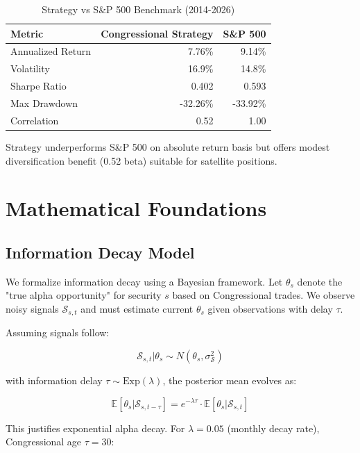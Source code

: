 \documentclass[twocolumn,ieee]{Base_Latex_Template/arithmaxresearch}
\begin{document}
\begin{table}[t]
\centering
\scriptsize
\setlength{\tabcolsep}{4pt}
\begin{tabular}{lrr}
\hline
\textbf{Metric} & \textbf{Congressional Strategy} & \textbf{S\&P 500} \\
\hline
Annualized Return & 7.76\% & 9.14\% \\
Volatility & 16.9\% & 14.8\% \\
Sharpe Ratio & 0.402 & 0.593 \\
Max Drawdown & -32.26\% & -33.92\% \\
Correlation & 0.52 & 1.00 \\
\hline
\end{tabular}
\caption{Strategy vs S\&P 500 Benchmark (2014-2026)}
\label{tab:benchmark}
\end{table}

Strategy underperforms S\&P 500 on absolute return basis but offers modest diversification benefit (0.52 beta) suitable for satellite positions.

\section{Mathematical Foundations}

\subsection{Information Decay Model}

We formalize information decay using a Bayesian framework. Let $\theta_s$ denote the "true alpha opportunity" for security $s$ based on Congressional trades. We observe noisy signals $\mathcal{S}_{s,t}$ and must estimate current $\theta_s$ given observations with delay $\tau$.

Assuming signals follow:

$$\mathcal{S}_{s,t} | \theta_s \sim N(\theta_s, \sigma_{\mathcal{S}}^2)$$

with information delay $\tau \sim \text{Exp}(\lambda)$, the posterior mean evolves as:

$$\mathbb{E}[\theta_s | \mathcal{S}_{s,t-\tau}] = e^{-\lambda\tau} \cdot \mathbb{E}[\theta_s | \mathcal{S}_{s,t}]$$

This justifies exponential alpha decay. For $\lambda = 0.05$ (monthly decay rate), Congressional age $\tau = 30$:
\end{document}
